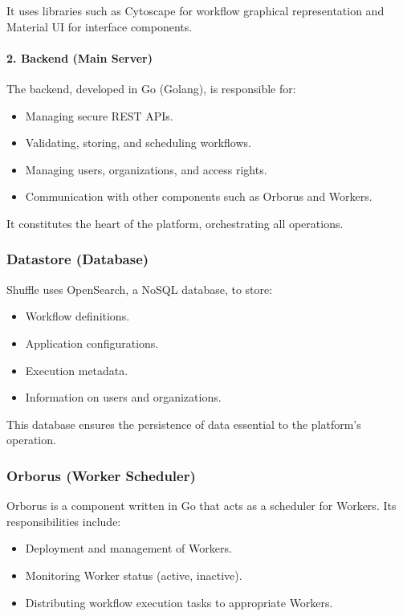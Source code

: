 It uses libraries such as Cytoscape for workflow graphical representation and Material UI for interface components.

\paragraph{2. Backend (Main Server)}
\label{par:shuffle-backend}

The backend, developed in Go (Golang), is responsible for:
\begin{itemize}
    \item Managing secure REST APIs.
    \item Validating, storing, and scheduling workflows.
    \item Managing users, organizations, and access rights.
    \item Communication with other components such as Orborus and Workers.
\end{itemize}

It constitutes the heart of the platform, orchestrating all operations.

\subsubsection{Datastore (Database)}

Shuffle uses OpenSearch, a NoSQL database, to store:
\begin{itemize}
    \item Workflow definitions.
    \item Application configurations.
    \item Execution metadata.
    \item Information on users and organizations.
\end{itemize}

This database ensures the persistence of data essential to the platform's operation.

\subsubsection{Orborus (Worker Scheduler)}

Orborus is a component written in Go that acts as a scheduler for Workers. Its responsibilities include:

\begin{itemize}
    \item Deployment and management of Workers.
    \item Monitoring Worker status (active, inactive).
    \item Distributing workflow execution tasks to appropriate Workers.
\end{itemize}

